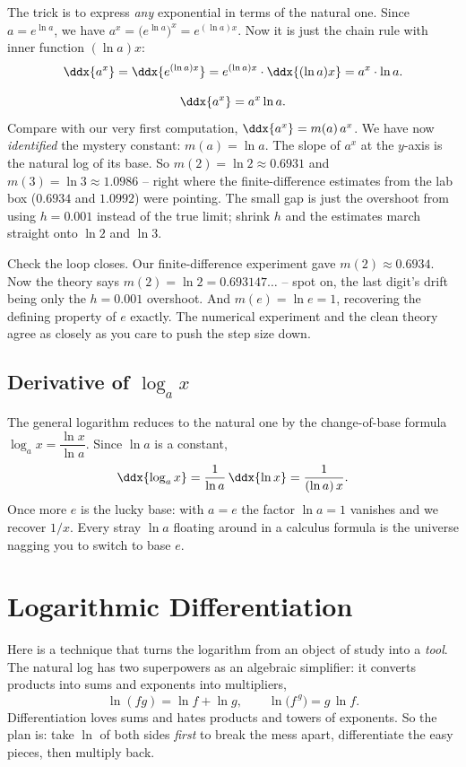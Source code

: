 The trick is to express \emph{any} exponential in terms of the natural one.
Since $a = e^{\ln a}$, we have $a^x = \big(e^{\ln a}\big)^x = e^{(\ln a)x}$.
Now it is just the chain rule with inner function $(\ln a)x$:
\[
   \ddx{a^x}
   = \ddx{e^{(\ln a)x}}
   = e^{(\ln a)x}\cdot \ddx{(\ln a)x}
   = a^x \cdot \ln a.
\]

\begin{focusbox}
\[
   \ddx{a^x} = a^x \ln a.
\]
Compare with our very first computation, $\ddx{a^x}=m(a)\,a^x$. We have now
\emph{identified} the mystery constant: $m(a) = \ln a$. The slope of $a^x$ at
the $y$-axis is the natural log of its base. So $m(2)=\ln 2\approx 0.6931$
and $m(3)=\ln 3\approx 1.0986$ -- right where the finite-difference estimates
from the lab box ($0.6934$ and $1.0992$) were pointing. The small gap is just
the overshoot from using $h=0.001$ instead of the true limit; shrink $h$ and
the estimates march straight onto $\ln 2$ and $\ln 3$.
\end{focusbox}

\begin{labbox}
Check the loop closes. Our finite-difference experiment gave
$m(2)\approx 0.6934$. Now the theory says $m(2)=\ln 2 = 0.693147\ldots$ --
spot on, the last digit's drift being only the $h=0.001$ overshoot. And
$m(e)=\ln e = 1$, recovering the defining property of $e$ exactly. The
numerical experiment and the clean theory agree as closely as you care to
push the step size down.
\end{labbox}

\subsection{Derivative of $\log_a x$}

The general logarithm reduces to the natural one by the change-of-base
formula $\log_a x = \dfrac{\ln x}{\ln a}$. Since $\ln a$ is a constant,
\[
   \ddx{\log_a x}
   = \frac{1}{\ln a}\,\ddx{\ln x}
   = \frac{1}{(\ln a)\,x}.
\]
Once more $e$ is the lucky base: with $a=e$ the factor $\ln a=1$ vanishes
and we recover $1/x$. Every stray $\ln a$ floating around in a calculus
formula is the universe nagging you to switch to base $e$.

\section{Logarithmic Differentiation}
\label{ch12:logdiff}

Here is a technique that turns the logarithm from an object of study into a
\emph{tool}. The natural log has two superpowers as an algebraic simplifier:
it converts products into sums and exponents into multipliers,
\[
   \ln(fg) = \ln f + \ln g,
   \qquad
   \ln\!\big(f^{\,g}\big) = g\,\ln f.
\]
Differentiation loves sums and hates products and towers of exponents. So
the plan is: take $\ln$ of both sides \emph{first} to break the mess apart,
differentiate the easy pieces, then multiply back.

